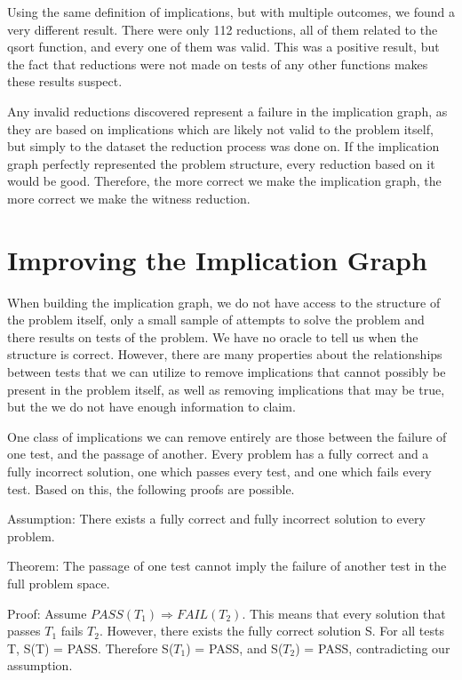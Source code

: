 \documentclass[11pt,twoside]{article}
\begin{document}
Using the same definition of implications, but with multiple outcomes, we found a very different result. There were only 112 reductions, all of them related to the qsort function, and every one of them was valid. This was a positive result, but the fact that reductions were not made on tests of any other functions makes these results suspect.

Any invalid reductions discovered represent a failure in the implication graph, as they are based on implications which are likely not valid to the problem itself, but simply to the dataset the reduction process was done on. If the implication graph perfectly represented the problem structure, every reduction based on it would be good. Therefore, the more correct we make the implication graph, the more correct we make the witness reduction.



\section{Improving the Implication Graph}



When building the implication graph, we do not have access to the structure of the problem itself, only a small sample of attempts to solve the problem and there results on tests of the problem. We have no oracle to tell us when the structure is correct. However, there are many properties about the relationships between tests that we can utilize to remove implications that cannot possibly be present in the problem itself, as well as removing implications that may be true, but the we do not have enough information  to claim.

One class of implications we can remove entirely are those between the failure of one test, and the passage of another. Every problem has a fully correct and a fully incorrect solution, one which passes every test, and one which fails every test. Based on this, the following proofs are possible.


Assumption: There exists a fully correct and fully incorrect solution to every problem.

Theorem: The passage of one test cannot imply the failure of another test in the full problem space.

Proof: Assume $PASS(T_1) \Rightarrow FAIL(T_2)$. This means that every solution that passes $T_1$ fails $T_2$. However, there exists the fully correct solution S. For all tests T, S(T) = PASS. Therefore S($T_1$) = PASS, and S($T_2$) = PASS, contradicting our assumption.
\end{document}
